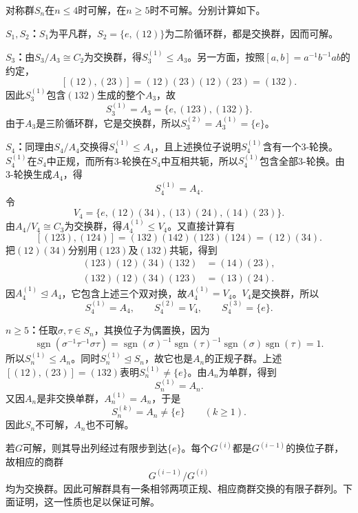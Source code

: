 \begin{example}
对称群$S_n$在$n\leq4$时可解，在$n\geq5$时不可解。分别计算如下。

\textbf{$S_1,S_2$：}$S_1$为平凡群，$S_2=\{e,(12)\}$为二阶循环群，都是交换群，因而可解。

\textbf{$S_3$：}由$S_3/A_3\cong C_2$为交换群，得$S_3^{(1)}\leq A_3$。另一方面，按照$[a,b]=a^{-1}b^{-1}ab$的约定，
\[
[(12),(23)]=(12)(23)(12)(23)=(132).
\]
因此$S_3^{(1)}$包含$(132)$生成的整个$A_3$，故
\[
S_3^{(1)}=A_3=\{e,(123),(132)\}.
\]
由于$A_3$是三阶循环群，它是交换群，所以$S_3^{(2)}=A_3^{(1)}=\{e\}$。

\textbf{$S_4$：}同理由$S_4/A_4$交换得$S_4^{(1)}\leq A_4$，且上述换位子说明$S_4^{(1)}$含有一个3-轮换。$S_4^{(1)}$在$S_4$中正规，而所有3-轮换在$S_4$中互相共轭，所以$S_4^{(1)}$包含全部3-轮换。由3-轮换生成$A_4$，得
\[
S_4^{(1)}=A_4.
\]
令
\[
V_4=\{e,(12)(34),(13)(24),(14)(23)\}.
\]
由$A_4/V_4\cong C_3$为交换群，得$A_4^{(1)}\leq V_4$。又直接计算有
\[
[(123),(124)]=(132)(142)(123)(124)=(12)(34).
\]
把$(12)(34)$分别用$(123)$及$(132)$共轭，得到
\begin{align*}
(123)(12)(34)(132)&=(14)(23),\\
(132)(12)(34)(123)&=(13)(24).
\end{align*}
因$A_4^{(1)}\trianglelefteq A_4$，它包含上述三个双对换，故$A_4^{(1)}=V_4$。$V_4$是交换群，所以
\[
S_4^{(1)}=A_4,\qquad S_4^{(2)}=V_4,\qquad S_4^{(3)}=\{e\}.
\]

\textbf{$n\geq5$：}任取$\sigma,\tau\in S_n$，其换位子为偶置换，因为
\[
\operatorname{sgn}(\sigma^{-1}\tau^{-1}\sigma\tau)
=\operatorname{sgn}(\sigma)^{-1}\operatorname{sgn}(\tau)^{-1}
\operatorname{sgn}(\sigma)\operatorname{sgn}(\tau)=1.
\]
所以$S_n^{(1)}\leq A_n$。同时$S_n^{(1)}\trianglelefteq S_n$，故它也是$A_n$的正规子群。上述$[(12),(23)]=(132)$表明$S_n^{(1)}\ne\{e\}$。由$A_n$为单群，得到
\[
S_n^{(1)}=A_n.
\]
又因$A_n$是非交换单群，$A_n^{(1)}=A_n$，于是
\[
S_n^{(k)}=A_n\ne\{e\}\qquad(k\geq1).
\]
因此$S_n$不可解，$A_n$也不可解。
\end{example}

若$G$可解，则其导出列经过有限步到达$\{e\}$。每个$G^{(i)}$都是$G^{(i-1)}$的换位子群，故相应的商群
\[
G^{(i-1)}/G^{(i)}
\]
均为交换群。因此可解群具有一条相邻两项正规、相应商群交换的有限子群列。下面证明，这一性质也足以保证可解。

